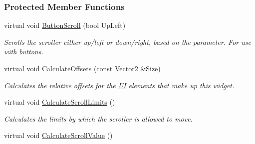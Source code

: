 \subsubsection*{Protected Member Functions}
\begin{DoxyCompactItemize}
\item 
\hypertarget{classMezzanine_1_1UI_1_1Scrollbar_a6a9452b5e9f5659bc4eeb38e7c4fc009}{
virtual void \hyperlink{classMezzanine_1_1UI_1_1Scrollbar_a6a9452b5e9f5659bc4eeb38e7c4fc009}{ButtonScroll} (bool UpLeft)}
\label{classMezzanine_1_1UI_1_1Scrollbar_a6a9452b5e9f5659bc4eeb38e7c4fc009}

\begin{DoxyCompactList}\small\item\em Scrolls the scroller either up/left or down/right, based on the parameter. For use with buttons. \item\end{DoxyCompactList}\item 
\hypertarget{classMezzanine_1_1UI_1_1Scrollbar_a4c2cab6e66695778cae733dd0b86d4c5}{
virtual void \hyperlink{classMezzanine_1_1UI_1_1Scrollbar_a4c2cab6e66695778cae733dd0b86d4c5}{CalculateOffsets} (const \hyperlink{classMezzanine_1_1Vector2}{Vector2} \&Size)}
\label{classMezzanine_1_1UI_1_1Scrollbar_a4c2cab6e66695778cae733dd0b86d4c5}

\begin{DoxyCompactList}\small\item\em Calculates the relative offsets for the \hyperlink{namespaceMezzanine_1_1UI}{UI} elements that make up this widget. \item\end{DoxyCompactList}\item 
\hypertarget{classMezzanine_1_1UI_1_1Scrollbar_af2ae33d0ee640e9175f7568609a14b2b}{
virtual void \hyperlink{classMezzanine_1_1UI_1_1Scrollbar_af2ae33d0ee640e9175f7568609a14b2b}{CalculateScrollLimits} ()}
\label{classMezzanine_1_1UI_1_1Scrollbar_af2ae33d0ee640e9175f7568609a14b2b}

\begin{DoxyCompactList}\small\item\em Calculates the limits by which the scroller is allowed to move. \item\end{DoxyCompactList}\item 
\hypertarget{classMezzanine_1_1UI_1_1Scrollbar_a3a61b0d26d1e73b7eccc96aa1283762e}{
virtual void \hyperlink{classMezzanine_1_1UI_1_1Scrollbar_a3a61b0d26d1e73b7eccc96aa1283762e}{CalculateScrollValue} ()}
\label{classMezzanine_1_1UI_1_1Scrollbar_a3a61b0d26d1e73b7eccc96aa1283762e}


\end{DoxyCompactItemize}
